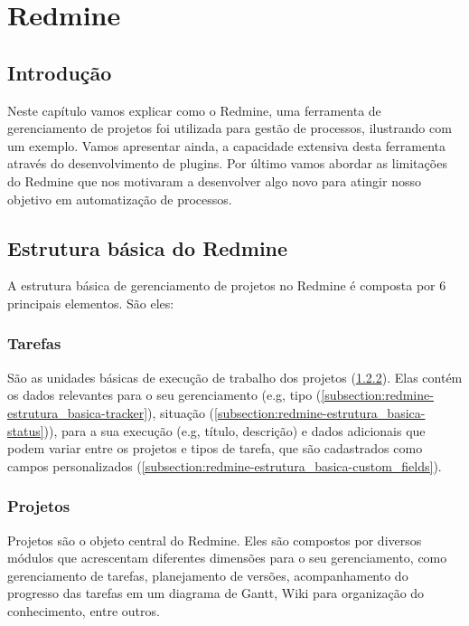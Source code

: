 \chapter{Redmine}\label{chp:redmine}

\section{Introdução}\label{sec:redmine-introducao}
Neste capítulo vamos explicar como o Redmine, uma ferramenta de gerenciamento de projetos foi utilizada para gestão de processos, ilustrando com um exemplo. Vamos apresentar ainda, a capacidade extensiva desta ferramenta através do desenvolvimento de plugins. Por último vamos abordar as limitações do Redmine que nos motivaram a desenvolver algo novo para atingir nosso objetivo em automatização de processos.


\section{Estrutura básica do Redmine}\label{sec:redmine-estrutura_basica}

A estrutura básica de gerenciamento de projetos no Redmine é composta por 6 principais elementos. São eles:

\subsection{Tarefas}\label{subsection:redmine-estrutura_basica-tarefa}

São as unidades básicas de execução de trabalho dos projetos (\ref{subsection:redmine-estrutura_basica-projeto}). Elas contém os dados relevantes para o seu gerenciamento (e.g, tipo (\ref{subsection:redmine-estrutura_basica-tracker}), situação (\ref{subsection:redmine-estrutura_basica-status})), para a sua execução (e.g, título, descrição) e dados adicionais que podem variar entre os projetos e tipos de tarefa, que são cadastrados como campos personalizados (\ref{subsection:redmine-estrutura_basica-custom_fields}).  

\subsection{Projetos}\label{subsection:redmine-estrutura_basica-projeto}

Projetos são o objeto central do Redmine. Eles são compostos por diversos módulos que acrescentam diferentes dimensões para o seu gerenciamento, como gerenciamento de tarefas, planejamento de versões, acompanhamento do progresso das tarefas em um diagrama de Gantt, Wiki para organização do conhecimento, entre outros. 

